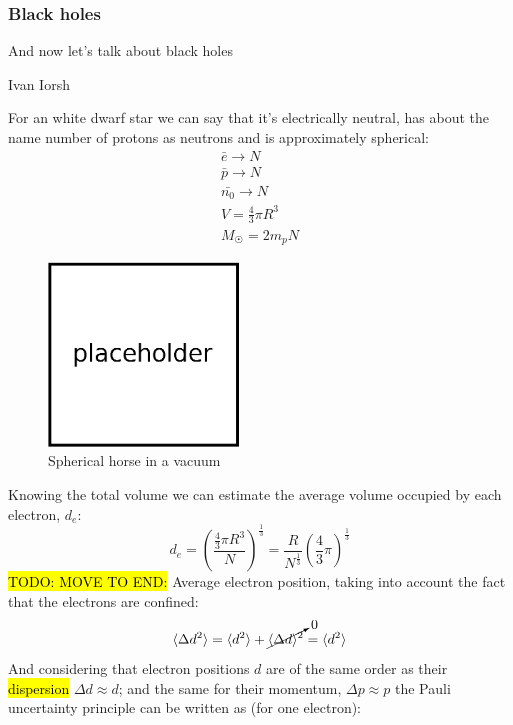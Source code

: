 		\subsubsection{Black holes}
			\epigraph{And now let's talk about black holes}{Ivan Iorsh}
			For an white dwarf star we can say that it's electrically neutral, has about the name number of protons as neutrons and is approximately spherical:
			\begin{align}
				\bar{e} \rightarrow N \\
				\bar{p} \rightarrow N \\
				\bar{n_0} \rightarrow N \\
				V = \frac{4}{3}\pi R^3 \\
				M_{\astrosun} = 2 m_p N
			\end{align}
			\begin{figure}[!h]
				\centering
				\includegraphics[width=0.45\textwidth]{./figs/placeholder.eps}
				\caption{Spherical horse in a vacuum}
				\label{star}
			\end{figure}
			Knowing the total volume we can estimate the average volume occupied by each electron, $d_e$:
			\begin{equation}
				d_e = \left( \frac{\frac{4}{3}\pi R^3}{N} \right) ^{\frac{1}{3}} = \frac{R}{N^{\frac{1}{3}}}\left( \frac{4}{3}\pi \right)^{\frac{1}{3}}
			\end{equation}
			\hl{TODO: MOVE TO END:}
			Average electron position, taking into account the fact that the electrons are confined:
			\begin{equation}
				\langle \Delta d^2 \rangle = \langle d^2 \rangle + \cancelto{0}{\langle\Delta d \rangle^2} =  \langle d^2 \rangle
			\end{equation}
			And considering that electron positions $d$ are of the same order as their \hl{dispersion} $\Delta d \approx d$; and the same for their momentum, $\Delta p \approx p$ the Pauli uncertainty principle can be written as (for one electron):
